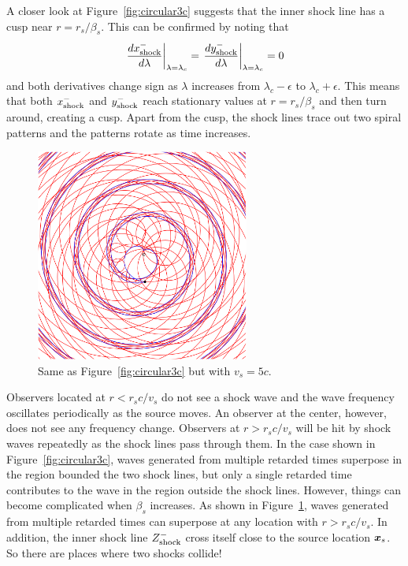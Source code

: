\documentclass[12pt]{article}
\newcommand \beq {\begin{equation}}
\newcommand \eeq {\end{equation}}
\newcommand{\ve}[1]{\mbox{\boldmath $#1$}}
\begin{document}
A closer look at Figure~\ref{fig:circular3c} suggests that the inner shock line 
has a cusp near $r=r_s/\beta_s$. This can be confirmed by noting that 
\beq
  \left. \frac{d x_{\rm shock}^-}{d\lambda}\right|_{\lambda=\lambda_c} 
= \left. \frac{d y_{\rm shock}^-}{d\lambda}\right|_{\lambda=\lambda_c} = 0 
\eeq
and both derivatives change sign as $\lambda$ increases from $\lambda_c-\epsilon$ to 
$\lambda_c+\epsilon$. This means that both $x_{\rm shock}^-$ and $y_{\rm shock}^-$ reach 
stationary values at $r=r_s/\beta_s$ and then turn around, creating a cusp. Apart 
from the cusp, the shock lines 
trace out two spiral patterns and the patterns rotate as time increases. 

\begin{figure}
\vskip -5mm
\includegraphics[width=7cm]{circular5c.png}
\caption{Same as Figure~\ref{fig:circular3c} but with $v_s=5c$.}
\label{fig:circular5c}
\end{figure}

Observers located at $r < r_s c/v_s$ do not see a shock wave and the wave frequency 
oscillates periodically as the source moves. An observer at the center, however, 
does not see any frequency change. Observers at $r>r_s c/v_s$ will be hit by shock 
waves repeatedly as the shock lines pass through them. In the case shown in 
Figure~\ref{fig:circular3c}, waves generated from multiple retarded times superpose 
in the region bounded the two shock lines, but only a single retarded time contributes 
to the wave in the region outside the shock lines. However, things can become complicated 
when $\beta_s$ increases. As shown in Figure~\ref{fig:circular5c}, waves 
generated from multiple retarded times can superpose at any location with $r > r_s c/v_s$. 
In addition, the inner shock line $Z_{\rm shock}^-$ cross itself close to the 
source location $\ve{x}_s$. So 
there are places where two shocks collide!
\end{document}
